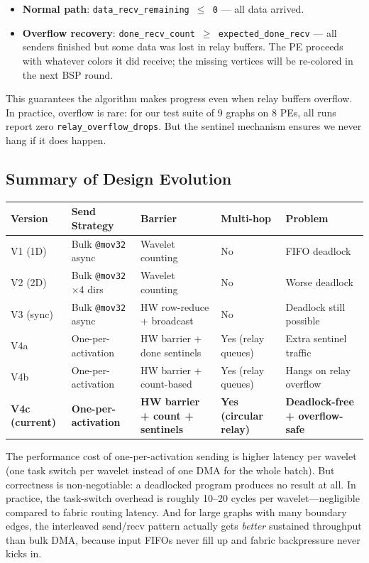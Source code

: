 \documentclass[11pt,letterpaper]{article}
\begin{document}
\begin{itemize}[nosep]
  \item \textbf{Normal path}: \texttt{data\_recv\_remaining $\leq$ 0} --- all data arrived.
  \item \textbf{Overflow recovery}: \texttt{done\_recv\_count $\geq$ expected\_done\_recv} --- all senders finished but some data was lost in relay buffers. The PE proceeds with whatever colors it did receive; the missing vertices will be re-colored in the next BSP round.
\end{itemize}

This guarantees the algorithm makes progress even when relay buffers overflow. In practice, overflow is rare: for our test suite of 9 graphs on 8 PEs, all runs report zero \texttt{relay\_overflow\_drops}. But the sentinel mechanism ensures we never hang if it does happen.

\subsection{Summary of Design Evolution}

\begin{center}
\renewcommand{\arraystretch}{1.3}
\begin{tabular}{p{42pt}p{85pt}p{70pt}p{70pt}p{80pt}}
\toprule
\textbf{Version} & \textbf{Send Strategy} & \textbf{Barrier} & \textbf{Multi-hop} & \textbf{Problem} \\
\midrule
V1 (1D) & Bulk \texttt{@mov32} async & Wavelet counting & No & FIFO deadlock \\
V2 (2D) & Bulk \texttt{@mov32} $\times$4 dirs & Wavelet counting & No & Worse deadlock \\
V3 (sync) & Bulk \texttt{@mov32} async & HW row-reduce + broadcast & No & Deadlock still possible \\
V4a & One-per-activation & HW barrier + done sentinels & Yes (relay queues) & Extra sentinel traffic \\
V4b & One-per-activation & HW barrier + count-based & Yes (relay queues) & Hangs on relay overflow \\
\textbf{V4c (current)} & \textbf{One-per-activation} & \textbf{HW barrier + count + sentinels} & \textbf{Yes (circular relay)} & \textbf{Deadlock-free + overflow-safe} \\
\bottomrule
\end{tabular}
\end{center}

The performance cost of one-per-activation sending is higher latency per wavelet (one task switch per wavelet instead of one DMA for the whole batch). But correctness is non-negotiable: a deadlocked program produces no result at all. In practice, the task-switch overhead is roughly 10--20 cycles per wavelet---negligible compared to fabric routing latency. And for large graphs with many boundary edges, the interleaved send/recv pattern actually gets \emph{better} sustained throughput than bulk DMA, because input FIFOs never fill up and fabric backpressure never kicks in.
\end{document}
